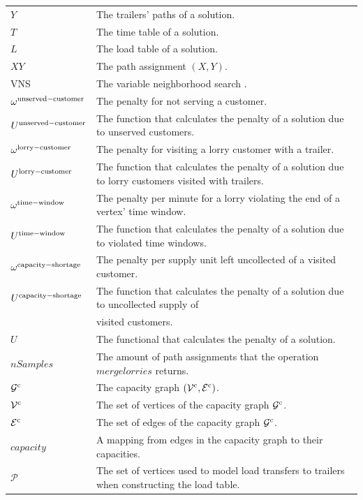\begin{longtable}{ll}
$Y$ & The trailers' paths of a solution.\\
$T$ & The time table of a solution.\\
$L$ & The load table of a solution.\\
$XY$ & The path assignment $(X,Y)$. \\
VNS & The variable neighborhood search . \\
$\omega^{\rm unserved-customer} $ & The penalty for not serving a  customer.  \\
$U^{\rm unserved-customer} $ & The function that calculates the penalty of a solution due to unserved customers. \\
$\omega^{\rm lorry-customer} $ & The penalty for visiting a lorry customer with a trailer. \\
$U^{\rm lorry-customer} $ & The function that calculates the penalty of a solution due to lorry customers visited with trailers. \\
$\omega^{\rm time-window} $ & The penalty per minute for a lorry violating the end of a vertex' time window. \\
$U^{\rm time-window} $ & The function that calculates the penalty of a solution due to violated time windows. \\
$\omega^{\rm capacity-shortage} $ & The penalty per supply unit left uncollected of a visited customer. \\
$U^{\rm capacity-shortage} $ & The function that calculates the penalty of a solution due to uncollected supply of \\
&  visited customers. \\
$U$ & The functional that calculates the penalty of a solution. \\
$nSamples$ & The amount of path assignments that the operation $merge lorries$ returns. \\
$\mathcal G^{\rm c}$ & The capacity graph $(\mathcal V^{\rm c},\mathcal E^{\rm c})$. \\
$\mathcal V^{\rm c}$ & The set of vertices of the capacity graph $\mathcal G^{\rm c}$. \\
$\mathcal E^{\rm c}$ & The set of edges of the capacity graph $\mathcal G^{\rm c}$.\\
$capacity $ & A mapping from edges in the capacity graph to their capacities. \\
$\mathcal P$ & The set of vertices used to model load transfers to trailers when constructing the load table.  \\

\end{longtable}
